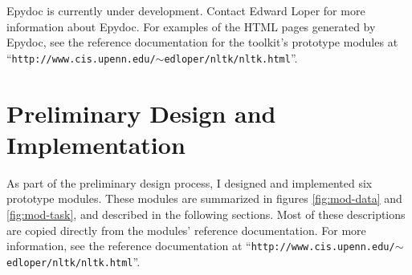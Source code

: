 \documentclass{article}
\begin{document}
Epydoc is currently under development.  Contact Edward Loper for more
information about Epydoc.  For examples of the HTML pages generated by
Epydoc, see the reference documentation for the toolkit's prototype
modules 
at ``\texttt{http://www.cis.upenn.edu/$\sim$edloper/nltk/nltk.html}''.

\section{Preliminary Design and Implementation}

As part of the preliminary design process, I designed and implemented
six prototype modules.  These modules are summarized in figures
\ref{fig:mod-data} and \ref{fig:mod-task}, and described in the
following sections.  Most of these descriptions are copied directly from
the modules' reference documentation.  For more information, see the
reference documentation 
at ``\texttt{http://www.cis.upenn.edu/$\sim$edloper/nltk/nltk.html}''.
\end{document}
